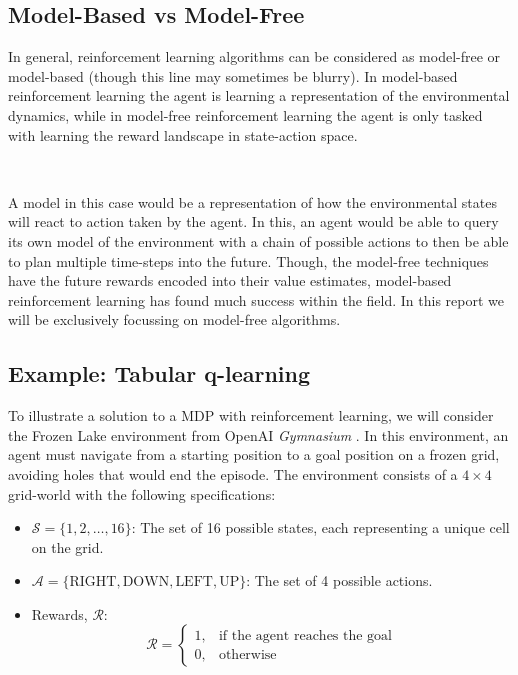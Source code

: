 \documentclass{article}
\begin{document}
\subsection{Model-Based vs Model-Free}

In general, reinforcement learning algorithms can be considered as model-free or model-based (though this line may sometimes be blurry). In model-based reinforcement learning the agent is learning a representation of the environmental dynamics, while in model-free reinforcement learning the agent is only tasked with learning the reward landscape in state-action space.

\

A model in this case would be a representation of how the environmental states will react to action taken by the agent. In this, an agent would be able to query its own model of the environment with a chain of possible actions to then be able to plan multiple time-steps into the future. Though, the model-free techniques have the future rewards encoded into their value estimates, model-based reinforcement learning has found much success within the field. \citep{moerland2022model} In this report we will be exclusively focussing on model-free algorithms.

\subsection{Example: Tabular q-learning}

To illustrate a solution to a MDP with reinforcement learning, we will consider the Frozen Lake environment from OpenAI \textit{Gymnasium} \citep{kwiatkowski2024gymnasium}. In this environment, an agent must navigate from a starting position to a goal position on a frozen grid, avoiding holes that would end the episode. The environment consists of a \(4 \times 4\) grid-world with the following specifications:

\begin{itemize}
    \item \(\mathcal{S} = \{1, 2, \dots, 16\}\): The set of 16 possible states, each representing a unique cell on the grid.
    \item \(\mathcal{A} = \{\text{RIGHT}, \text{DOWN}, \text{LEFT}, \text{UP}\}\): The set of 4 possible actions.
    \item Rewards, \(\mathcal{R}\):
    $$
    \mathcal{R} = \begin{cases}
        1, & \text{if the agent reaches the goal} \\
        0, & \text{otherwise}
    \end{cases}
    $$
\end{itemize}
\end{document}
